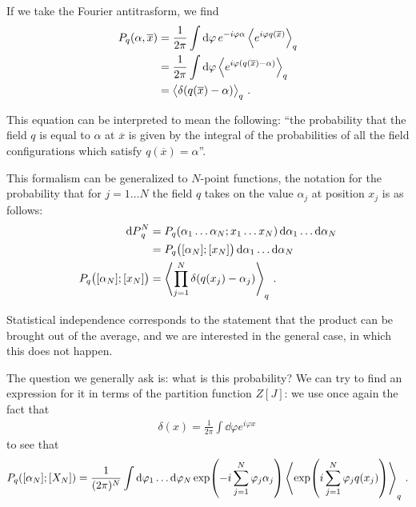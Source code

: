 \documentclass[main.tex]{subfiles}
\begin{document}

If we take the Fourier antitrasform, we find 
%
\begin{align}
P_q (\alpha , \overline{x}) &= \frac{1}{2 \pi } \int \dd{\varphi } e^{-i \varphi \alpha } \expval{e^{i \varphi q (\overline{x})}}_q  \\
&= \frac{1}{2 \pi } \int \dd{\varphi } \expval{e^{i \varphi (q(\overline{x}) - \alpha )}}_q  \\
&= \expval{ \delta (q(\overline{x}) - \alpha ) }_q
\,.
\end{align}

This equation can be interpreted to mean the following: ``the probability that the field \(q\) is equal to \(\alpha \) at \(\overline{x}\) is given by the integral of the probabilities of all the field configurations which satisfy \(q(\overline{x}) = \alpha \)''.

This formalism can be generalized to \(N\)-point functions, the notation for the probability that for \(j = 1 \dots N\) the field \(q\) takes on the value \(\alpha _j\) at position \(x_j\) is as follows: 
%
\begin{align}
\dd{P}_q^{N} &= P_q \qty(\alpha_1 \dots \alpha _N; x_1 \dots x_N) \dd{\alpha_1 } \dots \dd{\alpha _N}  \\
&= P_q \qty([\alpha _N]; [x_N]) \dd{\alpha_1 } \dots \dd{\alpha _N}  \\
P_q \qty([\alpha _N]; [x_N]) 
&= \expval{\prod_{j=1}^{N} \delta (q(x_j) - \alpha _j)}_q
\,.
\end{align}

Statistical independence corresponds to the statement that the product can be brought out of the average, and we are interested in the general case, in which this does not happen.

The question we generally ask is: what is this probability? We can try to find an expression for it in terms of the partition function \(Z[J]\): we use once again the fact that 
%
\begin{align}
\delta (x) = \frac{1}{2 \pi } \int \dd{\varphi } e^{i \varphi x}
\,
\end{align}
%
to see that 
%
\begin{align}
P_q ([\alpha _N]; [X_N]) = \frac{1}{(2 \pi )^{N}} \int \dd{\varphi_1 } \dots \dd{\varphi _N} \exp(- i \sum _{j=1}^{N} \varphi _j \alpha _j)
\expval{\exp(i \sum _{j=1}^{N}\varphi _j q(x_j))}_q
\,.
\end{align}
\end{document}
